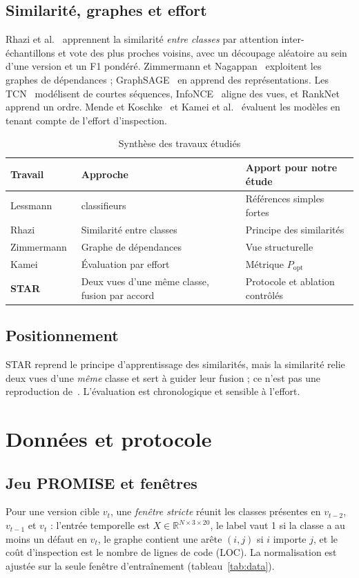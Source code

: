 \documentclass[conference,a4paper]{IEEEtran}
\newcommand{\sect}[1]{\section{\textcolor{ieeeblue}{#1}}}
\newcommand{\subsect}[1]{\subsection{\textcolor{ieeeblue}{#1}}}
\begin{document}
\subsect{Similarité, graphes et effort}
Rhazi et al.~\cite{rhazi2026} apprennent la similarité \emph{entre classes} par attention inter-échantillons et vote des
plus proches voisins, avec un découpage aléatoire au sein d'une version et un F1 pondéré. Zimmermann et
Nagappan~\cite{zimmermann2008} exploitent les graphes de dépendances ; GraphSAGE~\cite{hamilton2017} en apprend des
représentations. Les TCN~\cite{bai2018} modélisent de courtes séquences, InfoNCE~\cite{oord2018} aligne des vues, et
RankNet~\cite{burges2005} apprend un ordre. Mende et Koschke~\cite{mende2010} et Kamei et al.~\cite{kamei2013}
évaluent les modèles en tenant compte de l'effort d'inspection.

\begin{table}[t]
\centering
\caption{Synthèse des travaux étudiés}
\label{tab:sota}
\footnotesize
\begin{tabular}{@{}>{\raggedright\arraybackslash}p{1.85cm}>{\raggedright\arraybackslash}p{2.55cm}>{\raggedright\arraybackslash}p{2.55cm}@{}}
\toprule
Travail & Approche & Apport pour notre étude \\
\midrule
Lessmann~\cite{lessmann2008} & 22 classifieurs & Références simples fortes \\
Rhazi~\cite{rhazi2026} & Similarité entre classes & Principe des similarités \\
Zimmermann~\cite{zimmermann2008} & Graphe de dépendances & Vue structurelle \\
Kamei~\cite{kamei2013} & Évaluation par effort & Métrique $P_{\mathrm{opt}}$ \\
\textbf{STAR} & Deux vues d'une même classe, fusion par accord & Protocole et ablation contrôlés \\
\bottomrule
\end{tabular}
\end{table}

\subsect{Positionnement}
STAR reprend le principe d'apprentissage des similarités, mais la similarité relie deux vues d'une \emph{même} classe et
sert à guider leur fusion ; ce n'est pas une reproduction de~\cite{rhazi2026}. L'évaluation est chronologique et
sensible à l'effort.

\sect{Données et protocole}
\subsect{Jeu PROMISE et fenêtres}
Pour une version cible $v_t$, une \emph{fenêtre stricte} réunit les classes présentes en $v_{t-2}$, $v_{t-1}$ et $v_t$ :
l'entrée temporelle est $X\in\mathbb{R}^{N\times3\times20}$, le label vaut 1 si la classe a au moins un défaut en $v_t$,
le graphe contient une arête $(i,j)$ si $i$ importe $j$, et le coût d'inspection est le nombre de lignes de code (LOC).
La normalisation est ajustée sur la seule fenêtre d'entraînement (tableau~\ref{tab:data}).
\end{document}
